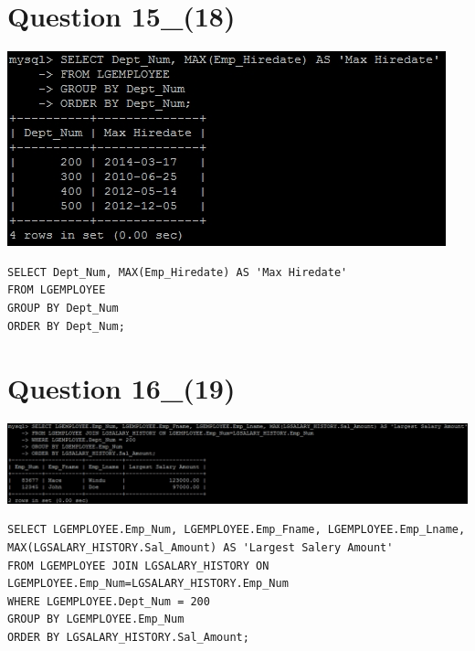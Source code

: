 \documentclass[a4paper,10pt]{article}
\begin{document}
\section {Question 15_(18)}
\includegraphics{Queries/Question_15_(18)/Q15_screenshot.jpg}
\lstset{
            language=SQL,
            breaklines=true
            }
        \begin{lstlisting}[frame=single]
        SELECT Dept_Num, MAX(Emp_Hiredate) AS 'Max Hiredate'
FROM LGEMPLOYEE
GROUP BY Dept_Num
ORDER BY Dept_Num;

        \end{lstlisting}
\section {Question 16_(19)}
\includegraphics{Queries/Question_16_(19)/Q16_screenshot.jpg}
\lstset{
            language=SQL,
            breaklines=true
            }
        \begin{lstlisting}[frame=single]
        SELECT LGEMPLOYEE.Emp_Num, LGEMPLOYEE.Emp_Fname, LGEMPLOYEE.Emp_Lname, MAX(LGSALARY_HISTORY.Sal_Amount) AS 'Largest Salery Amount'
FROM LGEMPLOYEE JOIN LGSALARY_HISTORY ON LGEMPLOYEE.Emp_Num=LGSALARY_HISTORY.Emp_Num
WHERE LGEMPLOYEE.Dept_Num = 200
GROUP BY LGEMPLOYEE.Emp_Num
ORDER BY LGSALARY_HISTORY.Sal_Amount;

        \end{lstlisting}
\end{document}
